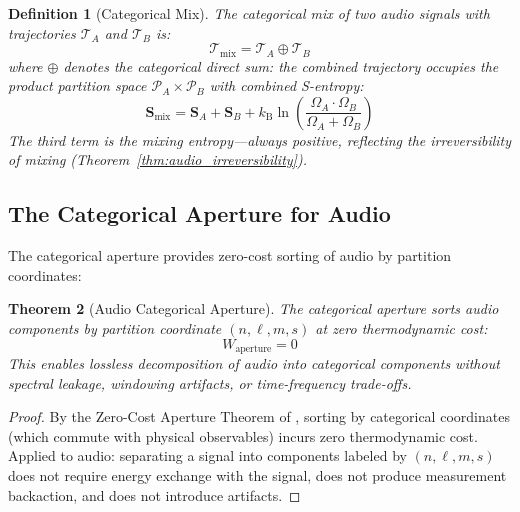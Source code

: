 \documentclass[twocolumn,10pt]{article}
\newtheorem{theorem}{Theorem}[section]
\newtheorem{definition}[theorem]{Definition}
\theoremstyle{remark}
\newcommand{\kB}{k_{\mathrm{B}}}
\newcommand{\calP}{\mathcal{P}}
\newcommand{\calT}{\mathcal{T}}
\begin{document}
\begin{definition}[Categorical Mix]
\label{def:categorical_mix}
The categorical mix of two audio signals with trajectories $\calT_A$ and $\calT_B$ is:
\begin{equation}
    \calT_{\mathrm{mix}} = \calT_A \oplus \calT_B
    \label{eq:categorical_mix}
\end{equation}
where $\oplus$ denotes the categorical direct sum: the combined trajectory occupies the product partition space $\calP_A \times \calP_B$ with combined S-entropy:
\begin{equation}
    \mathbf{S}_{\mathrm{mix}} = \mathbf{S}_A + \mathbf{S}_B + \kB \ln\!\left(\frac{\Omega_A \cdot \Omega_B}{\Omega_A + \Omega_B}\right)
    \label{eq:mix_entropy}
\end{equation}
The third term is the mixing entropy---always positive, reflecting the irreversibility of mixing (Theorem~\ref{thm:audio_irreversibility}).
\end{definition}

\subsection{The Categorical Aperture for Audio}

The categorical aperture \cite{sachikonye2026thermodynamics} provides zero-cost sorting of audio by partition coordinates:

\begin{theorem}[Audio Categorical Aperture]
\label{thm:audio_aperture}
The categorical aperture sorts audio components by partition coordinate $(n, \ell, m, s)$ at zero thermodynamic cost:
\begin{equation}
    W_{\mathrm{aperture}} = 0
    \label{eq:audio_aperture_cost}
\end{equation}
This enables lossless decomposition of audio into categorical components without spectral leakage, windowing artifacts, or time-frequency trade-offs.
\end{theorem}

\begin{proof}
By the Zero-Cost Aperture Theorem of \cite{sachikonye2026thermodynamics}, sorting by categorical coordinates (which commute with physical observables) incurs zero thermodynamic cost. Applied to audio: separating a signal into components labeled by $(n, \ell, m, s)$ does not require energy exchange with the signal, does not produce measurement backaction, and does not introduce artifacts.
\end{proof}
\end{document}
